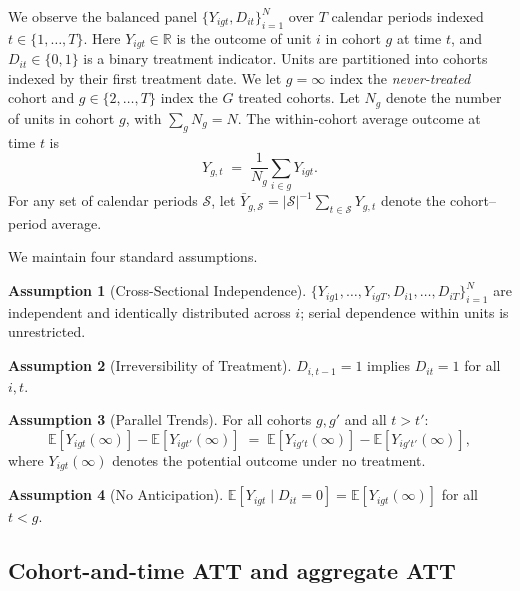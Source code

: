 \documentclass[12pt,letterpaper]{article}
\theoremstyle{remark}
\theoremstyle{definition}
\newtheorem{assumption}{Assumption}
\newcommand{\E}{\mathbb{E}}
\newcommand{\bY}{\bar{Y}}
\begin{document}
We observe the balanced panel $\{Y_{igt},D_{it}\}_{i=1}^{N}$ over $T$
calendar periods indexed $t\in\{1,\ldots,T\}$. Here $Y_{igt}\in\mathbb{R}$ is
the outcome of unit $i$ in cohort $g$ at time $t$, and $D_{it}\in\{0,1\}$ is a
binary treatment indicator. Units are partitioned into cohorts indexed by their
first treatment date. We let $g=\infty$ index the \emph{never-treated} cohort
and $g\in\{2,\ldots,T\}$ index the $G$ treated cohorts. Let $N_g$ denote the
number of units in cohort $g$, with $\sum_{g}N_g=N$. The within-cohort average
outcome at time $t$ is
\begin{equation}
  Y_{g,t} \;=\; \frac{1}{N_g}\sum_{i\in g}Y_{igt}.
  \label{eq:cohort_avg}
\end{equation}
For any set of calendar periods $\mathcal{S}$, let $\bY_{g,\mathcal{S}}=
|\mathcal{S}|^{-1}\sum_{t\in\mathcal{S}}Y_{g,t}$ denote the cohort--period
average.

\medskip
We maintain four standard assumptions.

\begin{assumption}[Cross-Sectional Independence]
  $\{Y_{ig1},\ldots,Y_{igT},D_{i1},\ldots,D_{iT}\}_{i=1}^{N}$ are
  independent and identically distributed across $i$; serial dependence
  within units is unrestricted.
\end{assumption}

\begin{assumption}[Irreversibility of Treatment]
  $D_{i,t-1}=1$ implies $D_{it}=1$ for all $i,t$.
\end{assumption}

\begin{assumption}[Parallel Trends]
  For all cohorts $g,g'$ and all $t>t'$:
  \[
    \E[Y_{igt}(\infty)]-\E[Y_{igt'}(\infty)]
    \;=\;
    \E[Y_{ig't}(\infty)]-\E[Y_{ig't'}(\infty)],
  \]
  where $Y_{igt}(\infty)$ denotes the potential outcome under no treatment.
\end{assumption}

\begin{assumption}[No Anticipation]
  $\E[Y_{igt}\mid D_{it}=0]=\E[Y_{igt}(\infty)]$ for all $t<g$.
\end{assumption}

\subsection*{Cohort-and-time ATT and aggregate ATT}
\end{document}
